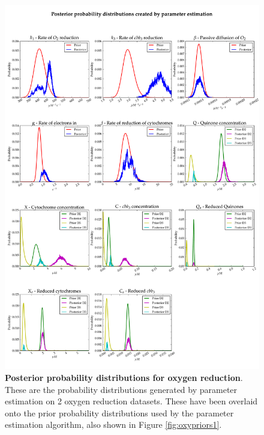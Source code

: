 \begin{figure}[p]
 \centering
 \includegraphics[width=15cm, trim=0cm 0cm 0cm 0cm]{./05-oxygenreduction/data/posteriors3.pdf}
 \caption[Posterior probability distributions for oxygen reduction]{{\bf Posterior probability distributions for oxygen reduction}. These are the probability distributions generated by parameter estimation on 2 oxygen reduction datasets. These have been overlaid onto the prior probability distributions used by the parameter estimation algorithm, also shown in Figure \ref{fig:oxypriors1}.
 \label{fig:oxyposteriors1}}
\end{figure}
\afterpage{\clearpage}

